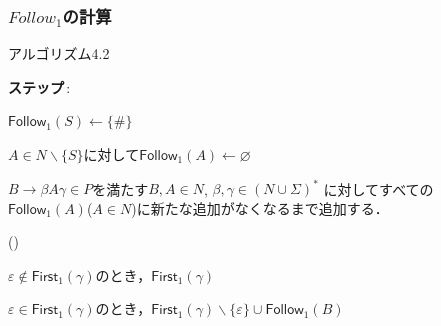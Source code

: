 \documentclass[dvipdfmx]{beamer}
\newcounter{coffee}
\begin{document}
\begin{frame}
  \frametitle{$Follow_1$の計算}

  {\small
    \begin{itembox}[l]{アルゴリズム4.2}
      \begin{list}{{\bf ステップ}\,{\rm {}:}}{}
        \item $\mathsf{Follow}_1(S)\leftarrow\{\#\}$
        \item $A\in N\backslash\{S\}$に対して$\mathsf{Follow}_1(A)\leftarrow\varnothing$
        \item
              $B\rightarrow\beta A\gamma\in P$を満たす$B,A\in N$, $\beta,\gamma\in(N\cup\Sigma)^\ast$
              に対してすべての$\mathsf{Follow}_1(A)$($A\in N$)に新たな追加がなくなるまで追加する．
              \begin{list}{()}{}
                \item $\varepsilon\notin\mathsf{First}_1(\gamma)$のとき，$\mathsf{First}_1(\gamma)$
                \item $\varepsilon\in\mathsf{First}_1({\gamma})$のとき，$\mathsf{First}_1(\gamma)\backslash\{\varepsilon\}\cup\mathsf{Follow}_1(B)$
              \end{list}
      \end{list}
    \end{itembox}}
\end{frame}
\end{document}
